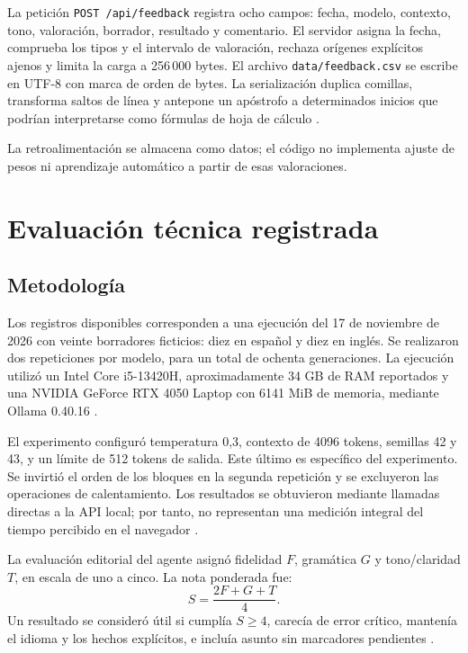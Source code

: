 \documentclass[conference]{IEEEtran}
\begin{document}
La petición \texttt{POST /api/feedback} registra ocho campos: fecha, modelo, contexto, tono, valoración, borrador, resultado y comentario. El servidor asigna la fecha, comprueba los tipos y el intervalo de valoración, rechaza orígenes explícitos ajenos y limita la carga a 256\,000 bytes. El archivo \texttt{data/feedback.csv} se escribe en UTF-8 con marca de orden de bytes. La serialización duplica comillas, transforma saltos de línea y antepone un apóstrofo a determinados inicios que podrían interpretarse como fórmulas de hoja de cálculo \cite{vite,csv}.

La retroalimentación se almacena como datos; el código no implementa ajuste de pesos ni aprendizaje automático a partir de esas valoraciones.

\section{Evaluación técnica registrada}
\subsection{Metodología}
Los registros disponibles corresponden a una ejecución del 17 de noviembre de 2026 con veinte borradores ficticios: diez en español y diez en inglés. Se realizaron dos repeticiones por modelo, para un total de ochenta generaciones. La ejecución utilizó un Intel Core i5-13420H, aproximadamente 34 GB de RAM reportados y una NVIDIA GeForce RTX 4050 Laptop con 6141 MiB de memoria, mediante Ollama 0.40.16 \cite{results,benchmark}.

El experimento configuró temperatura 0,3, contexto de 4096 tokens, semillas 42 y 43, y un límite de 512 tokens de salida. Este último es específico del experimento. Se invirtió el orden de los bloques en la segunda repetición y se excluyeron las operaciones de calentamiento. Los resultados se obtuvieron mediante llamadas directas a la API local; por tanto, no representan una medición integral del tiempo percibido en el navegador \cite{benchmark}.

La evaluación editorial del agente asignó fidelidad $F$, gramática $G$ y tono/claridad $T$, en escala de uno a cinco. La nota ponderada fue:
\begin{equation}
S=\frac{2F+G+T}{4}.
\end{equation}
Un resultado se consideró útil si cumplía $S\geq4$, carecía de error crítico, mantenía el idioma y los hechos explícitos, e incluía asunto sin marcadores pendientes \cite{benchmark}.
\end{document}
